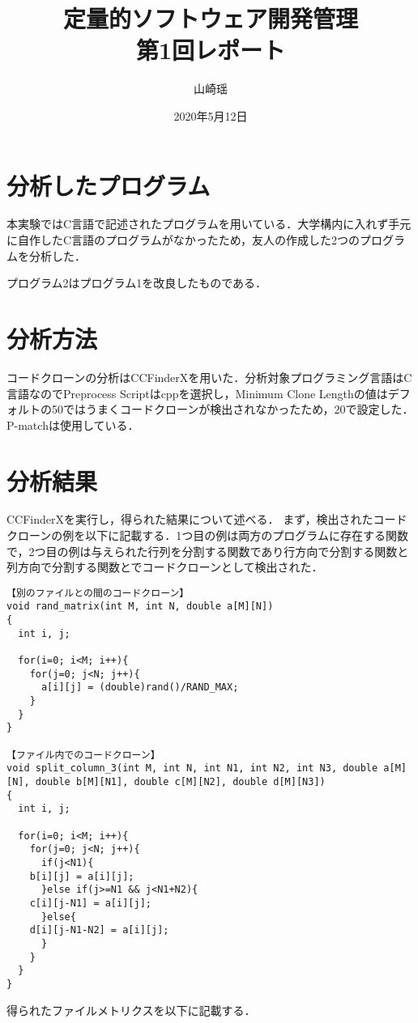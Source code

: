 \documentclass[11pt]{jarticle}
\title{定量的ソフトウェア開発管理\\第1回レポート}
\author{山崎瑶}
\date{2020年5月12日}
\begin{document}
\maketitle

\section{分析したプログラム}
本実験ではC言語で記述されたプログラムを用いている．大学構内に入れず手元に自作したC言語のプログラムがなかったため，友人の作成した2つのプログラムを分析した．

プログラム2はプログラム1を改良したものである．


\section{分析方法}
コードクローンの分析はCCFinderXを用いた．分析対象プログラミング言語はC言語なのでPreprocess Scriptはcppを選択し，Minimum Clone Lengthの値はデフォルトの50ではうまくコードクローンが検出されなかったため，20で設定した．P-matchは使用している．


\section{分析結果}
CCFinderXを実行し，得られた結果について述べる．
まず，検出されたコードクローンの例を以下に記載する．1つ目の例は両方のプログラムに存在する関数で，2つ目の例は与えられた行列を分割する関数であり行方向で分割する関数と列方向で分割する関数とでコードクローンとして検出された．

\begin{verbatim}
【別のファイルとの間のコードクローン】
void rand_matrix(int M, int N, double a[M][N])
{
  int i, j;

  for(i=0; i<M; i++){
    for(j=0; j<N; j++){
      a[i][j] = (double)rand()/RAND_MAX;
    }
  }
}

【ファイル内でのコードクローン】
void split_column_3(int M, int N, int N1, int N2, int N3, double a[M][N], double b[M][N1], double c[M][N2], double d[M][N3])
{
  int i, j;

  for(i=0; i<M; i++){
    for(j=0; j<N; j++){
      if(j<N1){
	b[i][j] = a[i][j];
      }else if(j>=N1 && j<N1+N2){
	c[i][j-N1] = a[i][j];
      }else{
	d[i][j-N1-N2] = a[i][j];
      }
    }
  }
}
\end{verbatim}

得られたファイルメトリクスを以下に記載する．
\end{document}
